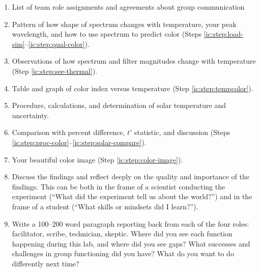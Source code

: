 \begin{enumerate}

	\item List of team role assignments and agreements about group communication

	\item Pattern of how shape of spectrum changes with temperature, your peak wavelength, and how to use spectrum to predict color (Steps \ref{ic:step:load-sim}--\ref{ic:step:qual-color}).
	
	\item Observations of how spectrum and filter magnitudes change with temperature (Step \ref{ic:step:see-thermal}).
	
	\item Table and graph of color index versus temperature (Step \ref{ic:step:tempcolor}).
	
	\item Procedure, calculations, and determination of solar temperature and uncertainty.
	
	\item Comparison with percent difference, $t'$ statistic, and discussion (Steps \ref{ic:step:proc-color}--\ref{ic:step:solar-compare}).
	
	\item Your beautiful color image (Step \ref{ic:step:color-image}).
	
	\item Discuss the findings and reflect deeply on the quality and importance of the findings. This can
	be both in the frame of a scientist conducting the experiment (“What did the experiment tell us
	about the world?”) and in the frame of a student (“What skills or mindsets did I learn?”).
	
	
	\item Write a 100--200 word paragraph reporting back from each of the four roles: facilitator, scribe, technician, skeptic. Where did you see each function happening during this lab, and where did you see gaps? What successes and challenges in group functioning did you have? What do you want to do differently next time?
\end{enumerate}
